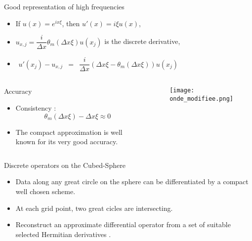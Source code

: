 \documentclass[11pt]{beamer}
\begin{document}
\begin{frame}{Good representation of high frequencies}
\begin{itemize}
\item If $u(x)=e^{i x \xi}$, then $u'(x)=i \xi u(x)$,
\item $u_{x,j} = \dfrac{i}{\Delta x} \theta_m ( \Delta x \xi ) u(x_j)$ is the discrete derivative,
\item $
\begin{array}{rcl}
u'(x_j) - u_{x,j} & = & \dfrac{i}{\Delta x} \left( \Delta x \xi - \theta_m(\Delta x \xi) \right) u(x_j)
\end{array}
$
\end{itemize}

\begin{columns}
\begin{block}{Accuracy}
\begin{itemize}
\item Consistency :
$$
\theta_m ( \Delta x \xi ) - \Delta x \xi \approx 0
$$
\item The compact approximation is well known for its very good accuracy.
\end{itemize}
\end{block}

\begin{center}
\begin{figure}
\texttt{[image: onde\_modifiee.png]}
\end{figure}
\end{center}
\end{columns}
\end{frame}


\begin{frame}{Discrete operators on the Cubed-Sphere}
\begin{itemize}
\item Data along any great circle on the sphere can be differentiated by a compact well chosen scheme.
\item At each grid point, two great cicles are intersecting. 
\item Reconstruct an approximate differential operator from a set of suitable selected Hermitian derivatives .
\end{itemize}
\end{frame}
\end{document}
